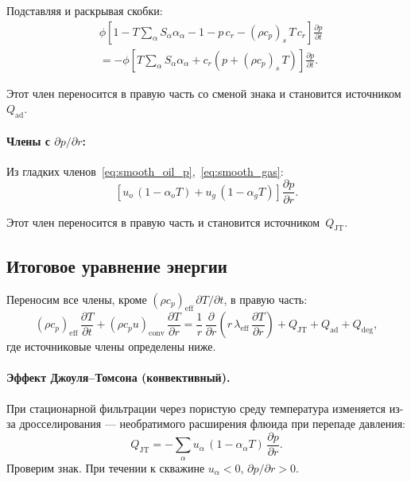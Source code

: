 \documentclass[12pt,a4paper]{article}
\begin{document}
Подставляя и раскрывая скобки:
\begin{align*}
  &\phi\!\left[1 - T\sum_\alpha S_\alpha\alpha_\alpha
    - 1 - p\,c_r - (\rho c_p)_s\,T\,c_r\right]
    \frac{\partial p}{\partial t} \\
  &= -\phi\!\left[T\sum_\alpha S_\alpha\alpha_\alpha
    + c_r\!\left(p + (\rho c_p)_s\,T\right)\right]
    \frac{\partial p}{\partial t}.
\end{align*}

Этот член переносится в правую часть со сменой знака и становится
источником~$Q_{\mathrm{ad}}$.

\paragraph{Члены с $\partial p/\partial r$:}
Из гладких членов~\eqref{eq:smooth_oil_p},~\eqref{eq:smooth_gas}:
\begin{equation}\label{eq:p_conv}
  \left[u_o\,(1-\alpha_o T)
    + u_g\,(1-\alpha_g T)\right]\frac{\partial p}{\partial r}.
\end{equation}

Этот член переносится в правую часть и становится источником~$Q_{\mathrm{JT}}$.

\subsection{Итоговое уравнение энергии}\label{ssec:energy_final}

Переносим все члены, кроме $(\rho c_p)_{\mathrm{eff}}\,\partial T/\partial t$,
в правую часть:
\begin{equation}\label{eq:energy_final}
  \boxed{
    (\rho c_p)_{\mathrm{eff}}\,\frac{\partial T}{\partial t}
    + (\rho c_p u)_{\mathrm{conv}}\,\frac{\partial T}{\partial r}
    = \frac{1}{r}\,\frac{\partial}{\partial r}\!\left(
        r\,\lambda_{\mathrm{eff}}\,\frac{\partial T}{\partial r}
      \right)
    + Q_{\mathrm{JT}} + Q_{\mathrm{ad}} + Q_{\mathrm{deg}},
  }
\end{equation}
где источниковые члены определены ниже.

\paragraph{Эффект Джоуля--Томсона (конвективный).}
При стационарной фильтрации через пористую среду температура изменяется
из-за дросселирования --- необратимого расширения флюида при перепаде
давления:
\begin{equation}\label{eq:QJT}
  \boxed{
    Q_{\mathrm{JT}} = -\sum_\alpha u_\alpha\,(1-\alpha_\alpha T)\,
      \frac{\partial p}{\partial r}.
  }
\end{equation}
Проверим знак. При течении к скважине $u_\alpha < 0$,
$\partial p/\partial r > 0$.
\end{document}
